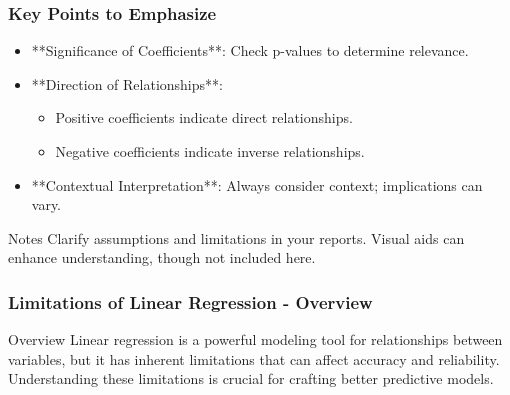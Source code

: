 \documentclass[aspectratio=169]{beamer}
\begin{document}
\begin{frame}[fragile]
    \frametitle{Key Points to Emphasize}
    \begin{itemize}
        \item **Significance of Coefficients**: Check p-values to determine relevance.
        \item **Direction of Relationships**: 
        \begin{itemize}
            \item Positive coefficients indicate direct relationships.
            \item Negative coefficients indicate inverse relationships.
        \end{itemize}
        \item **Contextual Interpretation**: Always consider context; implications can vary.
    \end{itemize}
    
    \begin{block}{Notes}
        Clarify assumptions and limitations in your reports. Visual aids can enhance understanding, though not included here.
    \end{block}
\end{frame}

\begin{frame}[fragile]
    \frametitle{Limitations of Linear Regression - Overview}
    \begin{block}{Overview}
        Linear regression is a powerful modeling tool for relationships between variables, 
        but it has inherent limitations that can affect accuracy and reliability. 
        Understanding these limitations is crucial for crafting better predictive models.
    \end{block}
\end{frame}
\end{document}
